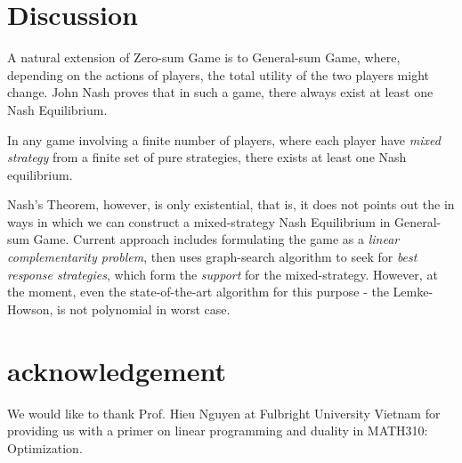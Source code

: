 \documentclass[journal, 11pt, a4paper, twoside]{IEEEtran}
\begin{document}
\section{Discussion}
A natural extension of Zero-sum Game is to General-sum Game, where, depending on the actions of players, the total utility of the two players might change. John Nash proves that in such a game, there always exist at least one Nash Equilibrium. 
\begin{theorem}
    In any game involving a finite number of players, where each player have \textit{mixed strategy} from a finite set of pure strategies, there exists at least one Nash equilibrium.
\end{theorem}
Nash's Theorem, however, is only existential, that is, it does not points out the in ways in which we can construct a mixed-strategy Nash Equilibrium in General-sum Game. Current approach includes formulating the game as a \textit{linear complementarity problem}, then uses graph-search algorithm to seek for \textit{best response strategies}, which form the \textit{support} for the mixed-strategy. However, at the moment, even the state-of-the-art algorithm for this purpose - the Lemke-Howson, is not polynomial in worst case.
\section*{acknowledgement}
    We would like to thank Prof. Hieu Nguyen at Fulbright University Vietnam for providing us with a primer on linear programming and duality in MATH310: Optimization.



\end{document}
